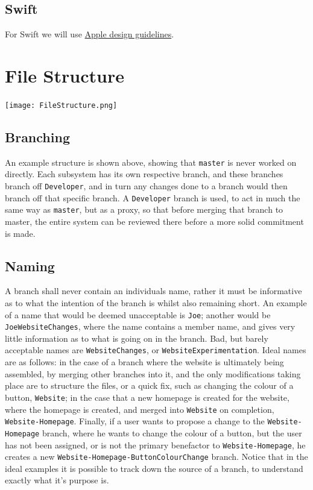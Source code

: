 \documentclass[12pt]{article}
\begin{document}
  \subsection{Swift}
  For Swift we will use \href{https://swift.org/documentation/api-design-guidelines/}{Apple design guidelines}.
  
  \center\section{File Structure}
  \texttt{[image: FileStructure.png]}
  \flushleft\subsection{Branching}
  
  An example structure is shown above, showing that \texttt{master} is never worked on directly. Each subsystem has its own respective branch, and these branches branch off \texttt{Developer}, and in turn any changes done to a branch would then branch off that specific branch. A \texttt{Developer} branch is used, to act in much the same way as \texttt{master}, but as a proxy, so that before merging that branch to master, the entire system can be reviewed there before a more solid commitment is made.
  \subsection{Naming}
  \flushleft
  A branch shall never contain an individuals name, rather it must be informative as to what the intention of the branch is whilst also remaining short. An example of a  name that would be deemed unacceptable is \texttt{Joe}; another would be \texttt{JoeWebsiteChanges}, where the name contains a member name, and gives very little information as to what is going on in the branch. Bad, but barely acceptable names are \texttt{WebsiteChanges}, or \texttt{WebsiteExperimentation}. Ideal names are as follows: in the case of a branch where the website is ultimately being assembled, by merging other branches into it, and the only modifications taking place are to structure the files, or a quick fix, such as changing the colour of a button, \texttt{Website}; in the case that a new homepage is created for the website, where the homepage is created, and merged into \texttt{Website} on completion, \texttt{Website-Homepage}. Finally, if a user wants to propose a change to the \texttt{Website-Homepage} branch, where he wants to change the colour of a button, but the user has not been assigned, or is not the primary benefactor to \texttt{Website-Homepage}, he creates a new \texttt{Website-Homepage-ButtonColourChange} branch. Notice that in the ideal examples it is possible to track down the source of a branch, to understand exactly what it's purpose is.
  
\end{document}
